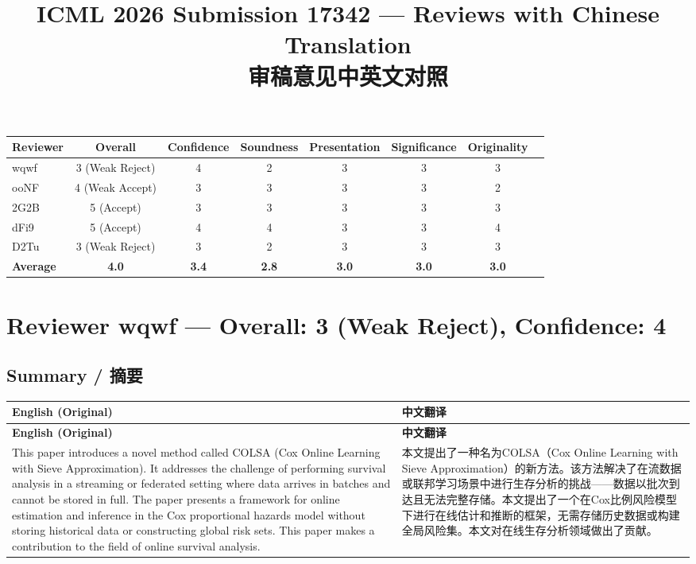 \documentclass[10pt,a4paper]{article}
\title{\textbf{ICML 2026 Submission 17342 --- Reviews with Chinese Translation}\\[0.5em]
\large 审稿意见中英文对照}
\author{}
\date{}
\begin{document}
\maketitle

\begin{center}
\begin{tabular}{lccccccc}
\toprule
\textbf{Reviewer} & \textbf{Overall} & \textbf{Confidence} & \textbf{Soundness} & \textbf{Presentation} & \textbf{Significance} & \textbf{Originality} \\
\midrule
wqwf & 3 (Weak Reject) & 4 & 2 & 3 & 3 & 3 \\
ooNF & 4 (Weak Accept) & 3 & 3 & 3 & 3 & 2 \\
2G2B & 5 (Accept) & 3 & 3 & 3 & 3 & 3 \\
dFi9 & 5 (Accept) & 4 & 4 & 3 & 3 & 4 \\
D2Tu & 3 (Weak Reject) & 3 & 2 & 3 & 3 & 3 \\
\midrule
\textbf{Average} & \textbf{4.0} & \textbf{3.4} & \textbf{2.8} & \textbf{3.0} & \textbf{3.0} & \textbf{3.0} \\
\bottomrule
\end{tabular}
\end{center}

\vspace{1em}

\section{Reviewer wqwf --- Overall: 3 (Weak Reject), Confidence: 4}

\subsection{Summary / 摘要}

\begin{longtable}{L{0.48\textwidth}|L{0.48\textwidth}}
\hline
\textbf{English (Original)} & \textbf{中文翻译} \\
\hline
\endfirsthead
\hline
\textbf{English (Original)} & \textbf{中文翻译} \\
\hline
\endhead
This paper introduces a novel method called COLSA (Cox Online Learning with Sieve Approximation). It addresses the challenge of performing survival analysis in a streaming or federated setting where data arrives in batches and cannot be stored in full. The paper presents a framework for online estimation and inference in the Cox proportional hazards model without storing historical data or constructing global risk sets. This paper makes a contribution to the field of online survival analysis.
&
本文提出了一种名为COLSA（Cox Online Learning with Sieve Approximation）的新方法。该方法解决了在流数据或联邦学习场景中进行生存分析的挑战——数据以批次到达且无法完整存储。本文提出了一个在Cox比例风险模型下进行在线估计和推断的框架，无需存储历史数据或构建全局风险集。本文对在线生存分析领域做出了贡献。 \\
\hline
\end{longtable}
\end{document}
